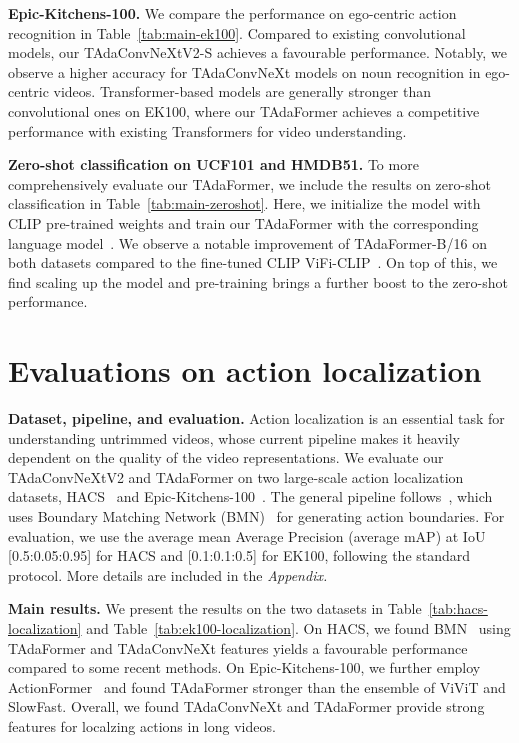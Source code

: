 \documentclass[10pt,journal,compsoc]{IEEEtran}
\begin{document}
\textbf{Epic-Kitchens-100.} We compare the performance on ego-centric action recognition in Table~\ref{tab:main-ek100}. Compared to existing convolutional models, our TAdaConvNeXtV2-S achieves a favourable performance. Notably, we observe a higher accuracy for TAdaConvNeXt models on noun recognition in ego-centric videos. Transformer-based models are generally stronger than convolutional ones on EK100, where our TAdaFormer achieves a competitive performance with existing Transformers for video understanding. 

\textbf{Zero-shot classification on UCF101 and HMDB51.} To more comprehensively evaluate our TAdaFormer, we include the results on zero-shot classification in Table~\ref{tab:main-zeroshot}. Here, we initialize the model with CLIP pre-trained weights and train our TAdaFormer with the corresponding language model~\cite{radford2021clip}. We observe a notable improvement of TAdaFormer-B/16 on both datasets compared to the fine-tuned CLIP ViFi-CLIP~\cite{rasheed2023vificlip}. 
On top of this, we find scaling up the model and pre-training brings a further boost to the zero-shot performance.

\section{Evaluations on action localization}
\label{sec:exp-tal}

\textbf{Dataset, pipeline, and evaluation.} 
Action localization is an essential task for understanding untrimmed videos, whose current pipeline makes it heavily dependent on the quality of the video representations.
We evaluate our TAdaConvNeXtV2 and TAdaFormer on two large-scale action localization datasets, HACS~\cite{hacs} and Epic-Kitchens-100~\cite{ek100}.
The general pipeline follows~\cite{ek100,ek100actionlocalization,hacscompetition}, which uses Boundary Matching Network (BMN)~\cite{bmn} for generating action boundaries.
For evaluation, we use the average mean Average Precision (average mAP) at IoU [0.5:0.05:0.95] for HACS and [0.1:0.1:0.5] for EK100, following the standard protocol.
More details are included in the \textit{Appendix.}

\textbf{Main results.} 
We present the results on the two datasets in Table~\ref{tab:hacs-localization} and Table~\ref{tab:ek100-localization}. On HACS, we found BMN~\cite{bmn} using TAdaFormer and TAdaConvNeXt features yields a favourable performance compared to some recent methods. On Epic-Kitchens-100, we further employ ActionFormer~\cite{zhang2022actionformer} and found TAdaFormer stronger than the ensemble of ViViT and SlowFast. Overall, we found TAdaConvNeXt and TAdaFormer provide strong features for localzing actions in long videos.
\end{document}
